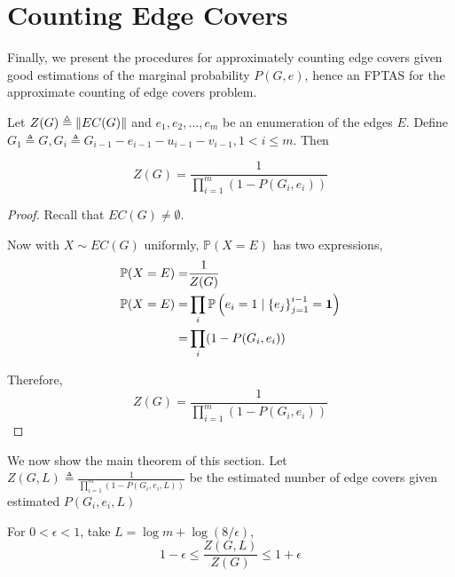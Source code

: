 \section{Counting Edge Covers}

Finally, we present the procedures for approximately counting edge covers given good estimations of the marginal probability $P(G,e)$, hence an FPTAS for the approximate counting of edge covers problem.

\begin{Prop}

	Let $Z(G) \triangleq \left\Vert EC(G)\right\Vert$ and $e_1,e_2,\ldots,e_m$ be an enumeration of the edges $E$. Define $G_1 \triangleq G, G_i \triangleq G_{i-1} - e_{i-1} - u_{i-1} - v_{i-1}, 1 < i \leq m $. Then

	\[ Z(G) = \frac{1}{\prod_{i=1}^m (1 - P(G_i, e_i))} \]

\end{Prop}

\begin{proof}
	Recall that $EC(G) \neq \emptyset$.%

	Now with $X \sim EC(G)$ uniformly, $\mathbb{P}(X=E)$ has two expressions,
	\begin{align*}
		\mathbb{P} (X = E) =& \frac{1}{Z(G)} \\
		\mathbb{P} (X = E) =& \prod_i \mathbb{P} \left(e_i = 1 \mid \left\{e_j\right\}_{j=1}^{i-1} = \mathbf{1} \right) \\
		=&\prod_i (1- P(G_i, e_i))
	\end{align*}

	Therefore, %
	\[ Z(G) = \frac{1}{\prod_{i=1}^m (1 - P(G_i, e_i))} \]
\end{proof}

We now show the main theorem of this section.
Let $Z(G, L) \triangleq \frac{1}{\prod_{i=1}^m (1 - P(G_i, e_i, L))}$ be the estimated number of edge covers given estimated $P(G_i, e_i, L)$

\begin{Thm}
	For $0< \epsilon <1$, take $L=\log m + \log(8/ \epsilon) $,
	\[ 1- \epsilon \leq \frac{Z(G, L)}{Z(G)} \leq 1+ \epsilon\]
\end{Thm}

